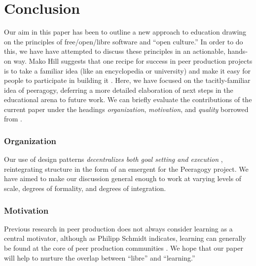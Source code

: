 \section{Conclusion}\label{sec:Conclusion}


Our aim in this paper has been to outline a new approach to education
drawing on the principles of free/open/libre software and ``open
culture.''  In order to do this, we have have attempted to discuss
these principles in an actionable, hands-on way.  Mako Hill suggests
that one recipe for success in peer production projects is to take a
familiar idea (like an encyclopedia or university) and make it easy
for people to participate in building it \cite{almost-wikipedia}.
Here, we have focused on the tacitly-familiar idea of peeragogy, deferring a
more detailed elaboration of next steps in the educational arena to
future work.  We can briefly evaluate the contributions of the current
paper under the headings \emph{organization}, \emph{motivation}, and
\emph{quality} borrowed from \cite{benkler2015peer}.

\vspace{-.25\baselineskip}

\subsubsection*{Organization} 
Our use of design patterns \emph{decentralizes both goal setting and
  execution} \cite{benkler2015peer}, reintegrating structure in the
form of an emergent  for the Peeragogy project.  We have
aimed to make our discussion general enough to work at varying levels
of scale, degrees of formality, and degrees of integration.

\vspace{-.25\baselineskip}

\subsubsection*{Motivation}  Previous research in peer production does not always consider learning as
a central motivator, although as Philipp Schmidt indicates, learning can generally be found at the core of peer production communities \cite{schmidt+commons-based+2009}.  We hope that our paper will help to nurture the overlap between ``libre'' and ``learning.''


